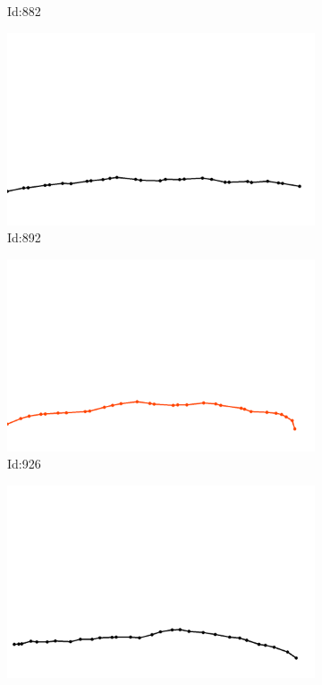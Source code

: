 \documentclass[12pt,twoside]{report}
\begin{document}
\begin{figure}
\begin{subfigure}[b]{0.20\textwidth}
\caption{Id:882}
\end{subfigure}
\begin{subfigure}[b]{0.20\textwidth}
\centering
\includegraphics[width=\textwidth]{../../trajectories/892.png}
\caption{Id:892}
\end{subfigure}
\begin{subfigure}[b]{0.20\textwidth}
\centering
\includegraphics[width=\textwidth]{../../trajectories/926.png}
\caption{Id:926}
\end{subfigure}
\begin{subfigure}[b]{0.20\textwidth}
\centering
\includegraphics[width=\textwidth]{../../trajectories/948.png}

\end{subfigure}
\end{figure}
\end{document}
